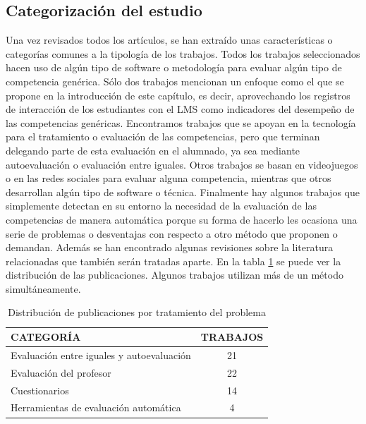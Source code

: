\subsection{Categorización del estudio}

Una vez revisados todos los artículos, se han extraído unas características o categorías comunes a la tipología de los trabajos. Todos los trabajos seleccionados hacen uso de algún tipo de software o metodología para evaluar algún tipo de competencia genérica. Sólo dos trabajos mencionan un enfoque como el que se propone en la introducción de este capítulo, es decir, aprovechando los registros de interacción de los estudiantes con el LMS como indicadores del desempeño de las competencias genéricas. Encontramos trabajos que se apoyan en la tecnología para el tratamiento o evaluación de las competencias, pero que terminan delegando parte de esta evaluación en el alumnado, ya sea mediante autoevaluación o evaluación entre iguales. Otros trabajos se basan en videojuegos o en las redes sociales para evaluar alguna competencia, mientras que otros desarrollan algún tipo de software o técnica. Finalmente hay algunos trabajos que simplemente detectan en su entorno la necesidad de la evaluación de las competencias de manera automática porque su forma de hacerlo les ocasiona una serie de problemas o desventajas con respecto a otro método que proponen o demandan. Además se han encontrado algunas revisiones sobre la literatura relacionadas que también serán tratadas aparte.  En la tabla \ref{tab:PublicacionesForum} se puede ver la distribución de las publicaciones. Algunos trabajos utilizan más de un método simultáneamente. %

\begin{table}
  \begin{center}
  \begin{tabular}{| m{10cm} | c |}
    \hline
    CATEGORÍA & TRABAJOS\\
    \hline
    \hline 
    Evaluación entre iguales y autoevaluación & 21\\
    \hline
    Evaluación del profesor & 22\\
    \hline
    Cuestionarios & 14\\
    \hline
    Herramientas de evaluación automática & 4\\
    \hline
  \end{tabular}
\end{center}
\caption{Distribución de publicaciones por tratamiento del problema}
\label{tab:PublicacionesForum}
\end{table} 

